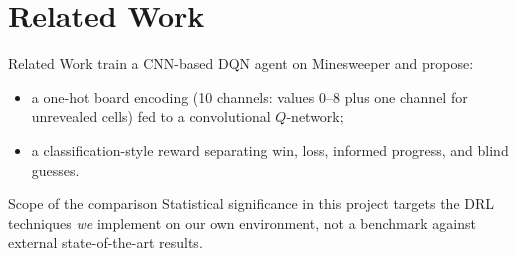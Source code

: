 
\section{Related Work}

\begin{frame}{Related Work}
  \textcite{wang2025minesweepercnn} train a CNN-based DQN agent on
  Minesweeper and propose:
  \begin{itemize}
    \item a \alert{one-hot board encoding} (10 channels: values $0$–$8$
      plus one channel for unrevealed cells) fed to a convolutional
      $Q$-network;
    \item a \alert{classification-style reward} separating win, loss,
      informed progress, and blind guesses.
  \end{itemize}
  \begin{highlightbox}{Scope of the comparison}
    Statistical significance in this project targets the DRL techniques
    \emph{we} implement on our own environment, not a benchmark against
    external state-of-the-art results.
  \end{highlightbox}
\end{frame}
